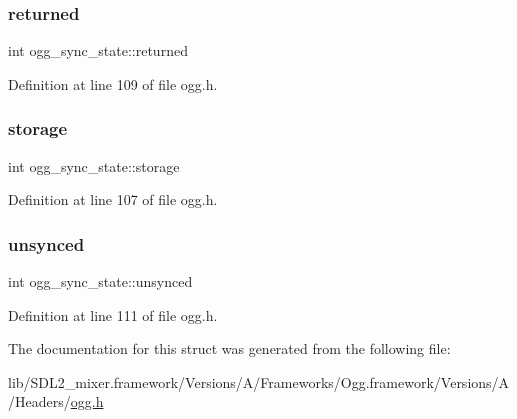 \subsubsection{\texorpdfstring{returned}{returned}}
{\footnotesize\ttfamily int ogg\+\_\+sync\+\_\+state\+::returned}



Definition at line 109 of file ogg.\+h.

\mbox{\label{structogg__sync__state_a15fc1bb5161fc4ae87b7a65982776c24}} 
\subsubsection{\texorpdfstring{storage}{storage}}
{\footnotesize\ttfamily int ogg\+\_\+sync\+\_\+state\+::storage}



Definition at line 107 of file ogg.\+h.

\mbox{\label{structogg__sync__state_a8d538bb32400470f00080e2160158a76}} 
\subsubsection{\texorpdfstring{unsynced}{unsynced}}
{\footnotesize\ttfamily int ogg\+\_\+sync\+\_\+state\+::unsynced}



Definition at line 111 of file ogg.\+h.



The documentation for this struct was generated from the following file\+:\begin{DoxyCompactItemize}
\item 
lib/\+S\+D\+L2\+\_\+mixer.\+framework/\+Versions/\+A/\+Frameworks/\+Ogg.\+framework/\+Versions/\+A/\+Headers/\mbox{\hyperlink{ogg_8h}{ogg.\+h}}\end{DoxyCompactItemize}
